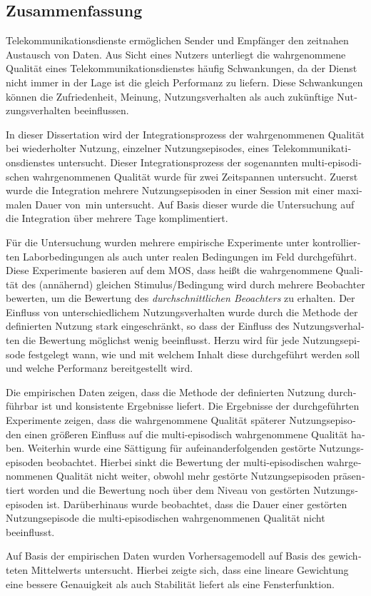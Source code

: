 \begin{otherlanguage}{ngerman}
\chapter*{Zusammenfassung}
Telekommunikationsdienste ermöglichen Sender und Empfänger den zeitnahen Austausch von Daten.
Aus Sicht eines Nutzers unterliegt die wahrgenommene Qualität eines Telekommunikationsdienstes häufig Schwankungen, da der Dienst nicht immer in der Lage ist die gleich Performanz zu liefern.
Diese Schwankungen können die Zufriedenheit, Meinung, Nutzungsverhalten als auch zukünftige Nutzungsverhalten beeinflussen.

In dieser Dissertation wird der Integrationsprozess der wahrgenommenen Qualität bei wiederholter Nutzung, einzelner Nutzungsepisodes, eines Telekommunikationsdienstes untersucht.
Dieser Integrationsprozess der sogenannten multi-episodischen wahrgenommenen Qualität wurde für zwei Zeitspannen untersucht.
Zuerst wurde die Integration mehrere Nutzungsepisoden in einer Session mit einer maximalen Dauer von~\unit[45]{min} untersucht.
Auf Basis dieser wurde die Untersuchung auf die Integration über mehrere Tage komplimentiert.

Für die Untersuchung wurden mehrere empirische Experimente unter kontrollierten Laborbedingungen als auch unter realen Bedingungen im Feld durchgeführt.
Diese Experimente basieren auf dem \acs{MOS}, dass heißt die wahrgenommene Qualität des (annähernd) gleichen Stimulus/Bedingung wird durch mehrere Beobachter bewerten, um die Bewertung des \emph{durchschnittlichen Beoachters} zu erhalten.
Der Einfluss von unterschiedlichem Nutzungsverhalten wurde durch die Methode der definierten Nutzung stark eingeschränkt, so dass der Einfluss des Nutzungsverhalten die Bewertung möglichst wenig beeinflusst.
Herzu wird für jede Nutzungsepisode festgelegt wann, wie und mit welchem Inhalt diese durchgeführt werden soll und welche Performanz bereitgestellt wird.

Die empirischen Daten zeigen, dass die Methode der definierten Nutzung durchführbar ist und konsistente Ergebnisse liefert.
Die Ergebnisse der durchgeführten Experimente zeigen, dass die wahrgenommene Qualität späterer Nutzungsepisoden einen größeren Einfluss auf die multi-episodisch wahrgenommene Qualität haben.
Weiterhin wurde eine Sättigung für aufeinanderfolgenden gestörte Nutzungsepisoden beobachtet.
Hierbei sinkt die Bewertung der multi-episodischen wahrgenommenen Qualität nicht weiter, obwohl mehr gestörte Nutzungsepisoden präsentiert worden und die Bewertung noch über dem Niveau von gestörten Nutzungsepisoden ist.
Darüberhinaus wurde beobachtet, dass die Dauer einer gestörten Nutzungsepisode die multi-episodischen wahrgenommenen Qualität nicht beeinflusst.

Auf Basis der empirischen Daten wurden Vorhersagemodell auf Basis des gewichteten Mittelwerts untersucht.
Hierbei zeigte sich, dass eine lineare Gewichtung eine bessere Genauigkeit als auch Stabilität liefert als eine Fensterfunktion.

\end{otherlanguage}
